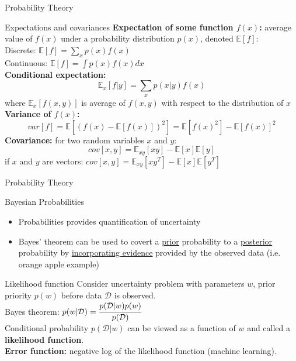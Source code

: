 \documentclass[9pt]{beamer}
\begin{document}
\begin{frame}{Probability Theory}
    \begin{alertblock}{Expectations and covariances}
        \textbf{Expectation of some function $f(x)$:} average value of $f(x)$ under a probability distribution $p(x)$, denoted $\mathbb{E}[f]$:\\
            Discrete: $\mathbb{E}[f] = \sum_x p(x)f(x)$\\
            Continuous: $\mathbb{E}[f] = \int p(x)f(x)dx$\\
        \textbf{Conditional expectation:}
            \[ \mathbb{E}_x[f|y] = \sum_x p(x|y)f(x) \]
            where $\mathbb{E}_x[f(x, y)]$ is average of $f(x,y)$ with respect to the distribution of $x$\\
        \textbf{Variance of $f(x)$:}
            \[ var[f] = \mathbb{E} \left[ (f(x) - \mathbb{E}[f(x)])^2 \right] = \mathbb{E}[f(x)^2] - \mathbb{E}[f(x)]^2 \]
        \textbf{Covariance:} for two random variables $x$ and $y$:
            \[ cov[x,y] = \mathbb{E}_{xy}[xy] - \mathbb{E}[x]\mathbb{E}[y] \]
            if $x$ and $y$ are vectors: $cov[x,y] = \mathbb{E}_{xy}[xy^T] - \mathbb{E}[x]\mathbb{E}[y^T]$
    \end{alertblock}
\end{frame}

\begin{frame}{Probability Theory}
    \begin{alertblock}{Bayesian Probabilities}
        \begin{itemize}
            \item Probabilities provides quantification of uncertainty
            \item Bayes' theorem can be used to covert a \underline{prior} probability to a \underline{posterior} probability
                by \underline{incorporating evidence} provided by the observed data (i.e. orange apple example)
        \end{itemize}
    \end{alertblock}
    \begin{alertblock}{Likelihood function}
        Consider uncertainty problem with parameters $w$, prior priority $p(w)$ before data $\mathcal{D}$ is observed.\\
        Bayes theorem: $p(w|\mathcal{D}) = \cfrac{p(\mathcal{D}|w) p(w)}{p(\mathcal{D})}$\\
        Conditional probability $p(\mathcal{D}|w)$ can be viewed as a function of $w$ and called a \textbf{likelihood function}.\\
        \textbf{Error function: } negative log of the likelihood function (machine learning).
    \end{alertblock}
\end{frame}
\end{document}
